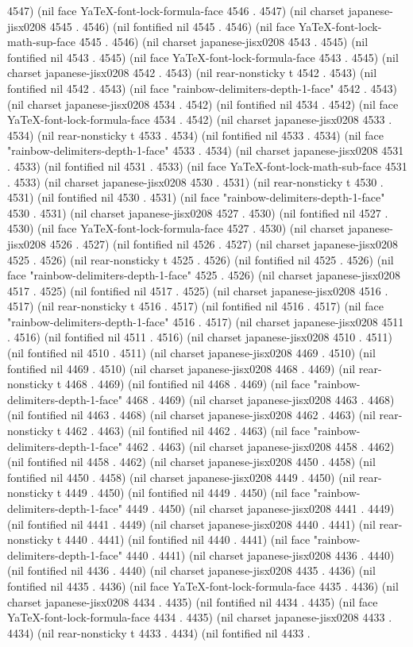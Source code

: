 4547) (nil face YaTeX-font-lock-formula-face 4546 . 4547) (nil charset japanese-jisx0208 4545 . 4546) (nil fontified nil 4545 . 4546) (nil face YaTeX-font-lock-math-sup-face 4545 . 4546) (nil charset japanese-jisx0208 4543 . 4545) (nil fontified nil 4543 . 4545) (nil face YaTeX-font-lock-formula-face 4543 . 4545) (nil charset japanese-jisx0208 4542 . 4543) (nil rear-nonsticky t 4542 . 4543) (nil fontified nil 4542 . 4543) (nil face "rainbow-delimiters-depth-1-face" 4542 . 4543) (nil charset japanese-jisx0208 4534 . 4542) (nil fontified nil 4534 . 4542) (nil face YaTeX-font-lock-formula-face 4534 . 4542) (nil charset japanese-jisx0208 4533 . 4534) (nil rear-nonsticky t 4533 . 4534) (nil fontified nil 4533 . 4534) (nil face "rainbow-delimiters-depth-1-face" 4533 . 4534) (nil charset japanese-jisx0208 4531 . 4533) (nil fontified nil 4531 . 4533) (nil face YaTeX-font-lock-math-sub-face 4531 . 4533) (nil charset japanese-jisx0208 4530 . 4531) (nil rear-nonsticky t 4530 . 4531) (nil fontified nil 4530 . 4531) (nil face "rainbow-delimiters-depth-1-face" 4530 . 4531) (nil charset japanese-jisx0208 4527 . 4530) (nil fontified nil 4527 . 4530) (nil face YaTeX-font-lock-formula-face 4527 . 4530) (nil charset japanese-jisx0208 4526 . 4527) (nil fontified nil 4526 . 4527) (nil charset japanese-jisx0208 4525 . 4526) (nil rear-nonsticky t 4525 . 4526) (nil fontified nil 4525 . 4526) (nil face "rainbow-delimiters-depth-1-face" 4525 . 4526) (nil charset japanese-jisx0208 4517 . 4525) (nil fontified nil 4517 . 4525) (nil charset japanese-jisx0208 4516 . 4517) (nil rear-nonsticky t 4516 . 4517) (nil fontified nil 4516 . 4517) (nil face "rainbow-delimiters-depth-1-face" 4516 . 4517) (nil charset japanese-jisx0208 4511 . 4516) (nil fontified nil 4511 . 4516) (nil charset japanese-jisx0208 4510 . 4511) (nil fontified nil 4510 . 4511) (nil charset japanese-jisx0208 4469 . 4510) (nil fontified nil 4469 . 4510) (nil charset japanese-jisx0208 4468 . 4469) (nil rear-nonsticky t 4468 . 4469) (nil fontified nil 4468 . 4469) (nil face "rainbow-delimiters-depth-1-face" 4468 . 4469) (nil charset japanese-jisx0208 4463 . 4468) (nil fontified nil 4463 . 4468) (nil charset japanese-jisx0208 4462 . 4463) (nil rear-nonsticky t 4462 . 4463) (nil fontified nil 4462 . 4463) (nil face "rainbow-delimiters-depth-1-face" 4462 . 4463) (nil charset japanese-jisx0208 4458 . 4462) (nil fontified nil 4458 . 4462) (nil charset japanese-jisx0208 4450 . 4458) (nil fontified nil 4450 . 4458) (nil charset japanese-jisx0208 4449 . 4450) (nil rear-nonsticky t 4449 . 4450) (nil fontified nil 4449 . 4450) (nil face "rainbow-delimiters-depth-1-face" 4449 . 4450) (nil charset japanese-jisx0208 4441 . 4449) (nil fontified nil 4441 . 4449) (nil charset japanese-jisx0208 4440 . 4441) (nil rear-nonsticky t 4440 . 4441) (nil fontified nil 4440 . 4441) (nil face "rainbow-delimiters-depth-1-face" 4440 . 4441) (nil charset japanese-jisx0208 4436 . 4440) (nil fontified nil 4436 . 4440) (nil charset japanese-jisx0208 4435 . 4436) (nil fontified nil 4435 . 4436) (nil face YaTeX-font-lock-formula-face 4435 . 4436) (nil charset japanese-jisx0208 4434 . 4435) (nil fontified nil 4434 . 4435) (nil face YaTeX-font-lock-formula-face 4434 . 4435) (nil charset japanese-jisx0208 4433 . 4434) (nil rear-nonsticky t 4433 . 4434) (nil fontified nil 4433 . 